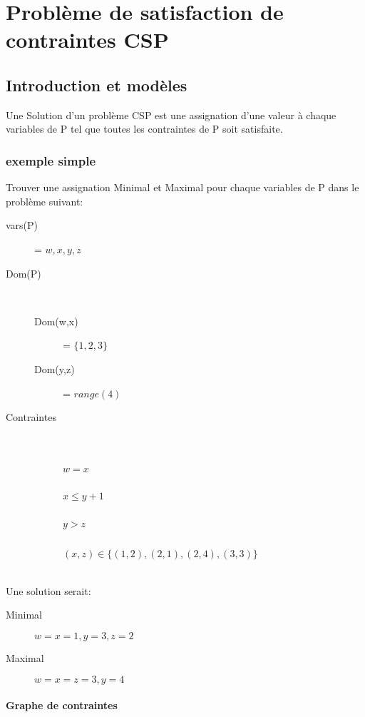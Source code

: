 \part{Problème de satisfaction de contraintes CSP}
\pagebreak

\chapter{Introduction et modèles}
\pagebreak

Une Solution d'un problème CSP est une assignation d'une valeur à chaque variables de P tel que toutes les contraintes de P soit satisfaite.\\

\section{exemple simple}

Trouver une assignation Minimal et Maximal pour chaque variables de P dans le problème suivant:\\
\begin{description}
\item[vars(P)] = $w,x,y,z$
\item[Dom(P)]\  \begin{description}
\item[Dom(w,x)] = $\{1,2,3\}$
\item[Dom(y,z)] = $range(4)$
\end{description}
\item[Contraintes]\  \begin{description}
\item[$~$] $w = x$
\item[$~$] $x \leq y + 1$
\item[$~$] $y > z$
\item[$~$] $(x,z) \in \{(1,2),(2,1),(2,4),(3,3)\}$
\end{description}
\end{description}
\ \\
Une solution serait:
\begin{description}
\item[Minimal] $w=x=1, y=3, z=2$
\item[Maximal] $w=x=z=3, y=4$
\end{description}

\pagebreak
\subsection{Graphe de contraintes}

